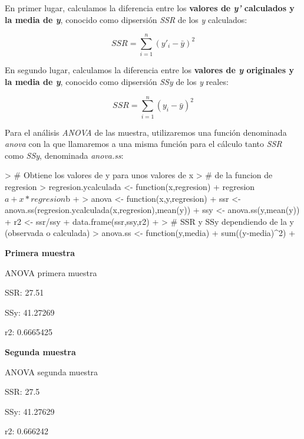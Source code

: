 \documentclass [a4paper] {article}
\begin{document}
En primer lugar, calculamos la diferencia entre los \textbf{valores de \textit{y'} calculados y la media
de \textit{y}}, conocido como dipsersión \textit{SSR} de los \textit{y} calculados:

\begin{equation*}
SSR = \sum_{i=1}^{n} (y'_{i} - \bar{y})^2
\end{equation*}

En segundo lugar, calculamos la diferencia entre los \textbf{valores de \textit{y} originales y la media
de \textit{y}}, conocido como dipsersión \textit{SSy} de los \textit{y} reales:

\begin{equation*}
SSR = \sum_{i=1}^{n} (y_{i} - \bar{y})^2
\end{equation*}

Para el análisis \textit{ANOVA} de las muestra, utilizaremos una función denominada \textit{anova} con la
que llamaremos a una misma función para el cálculo tanto \textit{SSR} como \textit{SSy}, denominada
\textit{anova.ss}:
\begin{Schunk}
\begin{Sinput}
> # Obtiene los valores de y para unos valores de x
> # de la funcion de regresion
> regresion.ycalculada <- function(x,regresion){
+   regresion$a + x*regresion$b
+ }
> anova <- function(x,y,regresion){
+   ssr <- anova.ss(regresion.ycalculada(x,regresion),mean(y))
+   ssy <- anova.ss(y,mean(y))
+   r2 <- ssr/ssy
+   data.frame(ssr,ssy,r2)
+ }
> # SSR y SSy dependiendo de la y (observada o calculada)
> anova.ss <- function(y,media){
+   sum((y-media)^2)
+ }
\end{Sinput}
\end{Schunk}

\textbf{Primera muestra}
\begin{Schunk}
\begin{Soutput}
ANOVA primera muestra
\end{Soutput}
\begin{Soutput}
SSR:  27.51
\end{Soutput}
\begin{Soutput}
SSy:  41.27269
\end{Soutput}
\begin{Soutput}
r2:  0.6665425
\end{Soutput}
\end{Schunk}

\textbf{Segunda muestra}
\begin{Schunk}
\begin{Soutput}
ANOVA segunda muestra
\end{Soutput}
\begin{Soutput}
SSR:  27.5
\end{Soutput}
\begin{Soutput}
SSy:  41.27629
\end{Soutput}
\begin{Soutput}
r2:  0.666242
\end{Soutput}
\end{Schunk}
\end{document}
